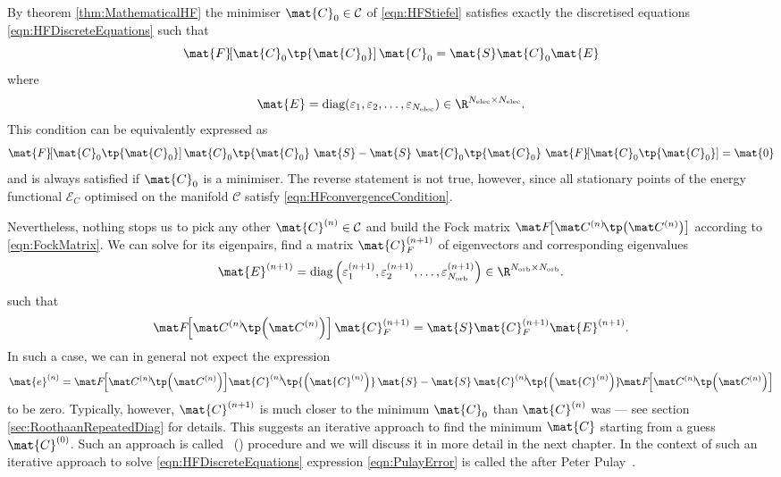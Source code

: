 \begin{rem}
\label{rem:PropertiesDiscretised}
By theorem \vref{thm:MathematicalHF}
the minimiser $\mat{C}_0 \in \mathcal{C}$ of \eqref{eqn:HFStiefel}
satisfies exactly the discretised \HF equations \eqref{eqn:HFDiscreteEquations}
such that
\newcommand{\matFzfull}{\mat{F}\!\!\left[\mat{C}_0\tp{\mat{C}_0}\right]}
\[
	\matFzfull \mat{C}_0 = \mat{S} \mat{C}_0 \mat{E}
\]
where
\[
	\mat{E} = \text{diag}(\varepsilon_1, \varepsilon_2, \ldots,
		\varepsilon_{\Nelec}) \in \R^{\Nelec \times \Nelec}.
\]
This condition can be equivalently expressed as~\cite{Pulay1982}
\begin{equation}
	\matFzfull \mat{C}_0\tp{\mat{C}_0} \
	\mat{S} - \mat{S} \ \mat{C}_0\tp{\mat{C}_0} \ \matFzfull
	= \mat{0}
	\label{eqn:HFconvergenceCondition}
\end{equation}
and is always satisfied if $\mat{C}_0$ is a minimiser.
The reverse statement is not true, however,
since all stationary points of the energy functional
$\mathcal{E}_C$ optimised on the manifold $\mathcal{C}$
satisfy \eqref{eqn:HFconvergenceCondition}.

Nevertheless, nothing stops us to pick any other $\mat{C}^{(n)} \in \mathcal{C}$
and build the Fock matrix $\matFnfull$
according to \eqref{eqn:FockMatrix}.
We can solve for its eigenpairs, \ie find a matrix $\mat{C}_F^{(n+1)}$
of eigenvectors and corresponding eigenvalues
\[
	\mat{E}^{(n+1)}
	= \text{diag}\left(\varepsilon_1^{(n+1)},
	\varepsilon_2^{(n+1)}, \ldots,
	\varepsilon_{\Norb}^{(n+1)}\right) \in \R^{\Norb \times \Norb}.
\]
such that
\begin{equation}
	\matFnfull \mat{C}_F^{(n+1)} = \mat{S} \mat{C}_F^{(n+1)} \mat{E}^{(n+1)}.
	\label{eqn:HFiterated}
\end{equation}
In such a case, we can in general not expect the expression
\begin{equation}
	\mat{e}^{(n)}
	= \matFnfull \! \mat{C}^{(n)}\!\tp{\left(\mat{C}^{(n)}\right)} \, \mat{S}
	- \mat{S} \, \mat{C}^{(n)}\!\tp{\left(\mat{C}^{(n)}\right)} \! \matFnfull
	\label{eqn:PulayError}
\end{equation}
to be zero.
Typically, however, $\mat{C}^{(n+1)}$ is
much closer to the minimum $\mat{C}_0$ than $\mat{C}^{(n)}$
was --- see section \vref{sec:RoothaanRepeatedDiag} for details.
This suggests an iterative approach to find the minimum $\mat{C}$
starting from a guess $\mat{C}^{(0)}$.
Such an approach is called ~(\SCF) procedure
and we will discuss it in more detail in the next chapter.
In the context of such an iterative approach
to solve \eqref{eqn:HFDiscreteEquations}
expression \eqref{eqn:PulayError} is called the 
after Peter Pulay~\cite{Pulay1982}.


\end{rem}
